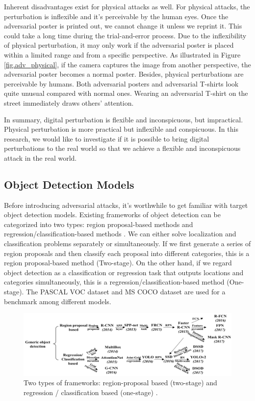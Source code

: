 
Inherent disadvantages exist for physical attacks as well. For physical attacks, the perturbation is inflexible and it's perceivable by the human eyes. Once the adversarial poster is printed out, we cannot change it unless we reprint it. This could take a long time during the trial-and-error process. Due to the inflexibility of physical perturbation, it may only work if the adversarial poster is placed within a limited range and from a specific perspective. As illustrated in Figure \ref{fig.adv_physical}, if the camera captures the image from another perspective, the adversarial poster becomes a normal poster. Besides, physical perturbations are perceivable by humans. Both adversarial posters and adversarial T-shirts look quite unusual compared with normal ones. Wearing an adversarial T-shirt on the street immediately draws others' attention. 

In summary, digital perturbation is flexible and inconspicuous, but impractical. Physical perturbation is more practical but inflexible and conspicuous. In this research, we would like to investigate if it is possible to bring digital perturbations to the real world so that we achieve a flexible and inconspicuous attack in the real world.

\subsection{Object Detection Models}

Before introducing adversarial attacks, it's worthwhile to get familiar with target object detection models. Existing frameworks of object detection can be categorized into two types: region proposal-based methods and regression/classification-based methods \cite{Zhao2019}. We can either solve localization and classification problems separately or simultaneously. If we first generate a series of region proposals and then classify each proposal into different categories, this is a region proposal-based method (Two-stage). On the other hand, if we regard object detection as a classification or regression task that outputs locations and categories simultaneously, this is a regression/classification-based method (One-stage). The PASCAL VOC dataset and MS COCO dataset are used for a benchmark among different models.

\begin{figure}[H]
\centering
\includegraphics[scale=0.6]{figures/chapter_detection/detection_review.png}
\caption{Two types of frameworks: region-proposal based (two-stage) and regression / classification based (one-stage) \cite{Zhao2019}.}
\label{fig.detection_frame}
\end{figure}

